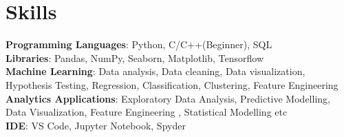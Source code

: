 \section{Skills}
 \begin{itemize}[leftmargin=0.15in, label={}]
    \small{\item{
     \textbf{Programming Languages}{: Python, C/C++(Beginner), SQL} \\
     \textbf{Libraries}{: Pandas, NumPy, Seaborn, Matplotlib, Tensorflow}\\
     \textbf{Machine Learning}{: Data analysis, Data cleaning, Data visualization, Hypothesis Testing, Regression, Classification, Clustering, Feature Engineering}\\
     \textbf{Analytics Applications}{: Exploratory  Data Analysis, Predictive Modelling, Data Visualization, Feature Engineering , Statistical Modelling etc}\\
     \textbf{IDE}{: VS Code, Jupyter Notebook, Spyder}\\
    }}
 \end{itemize}